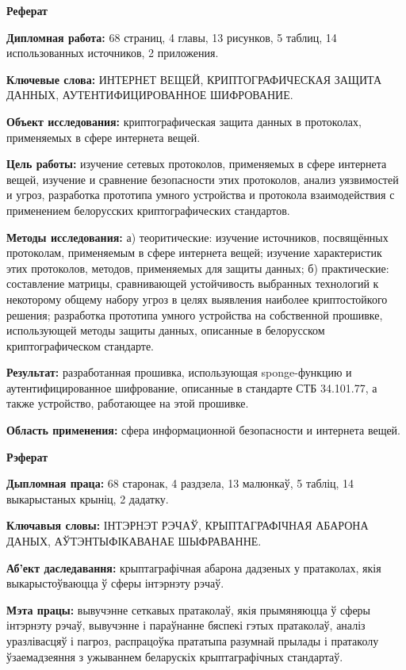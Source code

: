 \newpage
\begin{center}{\bf \Large Реферат}\end{center}
  
\textbf{Дипломная работа:} 68 страниц, 4 главы, 13 рисунков, 5 таблиц, 14 использованных источников,
2 приложения.

\textbf{Ключевые слова:} ИНТЕРНЕТ ВЕЩЕЙ, КРИПТОГРАФИЧЕСКАЯ ЗАЩИТА ДАННЫХ, 
АУТЕНТИФИЦИРОВАННОЕ ШИФРОВАНИЕ.

\textbf{Объект исследования:} криптографическая защита данных в протоколах, применяемых в сфере 
интернета вещей.

\textbf{Цель работы:} изучение сетевых протоколов, применяемых в сфере интернета вещей, изучение
и сравнение безопасности этих протоколов, анализ уязвимостей и угроз, разработка прототипа умного
устройства и протокола взаимодействия с применением белорусских криптографических стандартов.

\textbf{Методы исследования:} а) теоритические: изучение источников, посвящённых протоколам,
применяемым в сфере интернета вещей; изучение характеристик этих протоколов, методов, применяемых
для защиты данных; б) практические: составление матрицы, сравнивающей устойчивость выбранных 
технологий к некоторому общему набору угроз в целях выявления наиболее криптостойкого решения;
разработка прототипа умного устройства на собственной прошивке, использующей методы защиты
данных, описанные в белорусском криптографическом стандарте.

\textbf{Результат:} разработанная прошивка, использующая sponge-функцию и аутентифицированное
шифрование, описанные в стандарте СТБ 34.101.77, а также устройство, работающее на этой прошивке.

\textbf{Область применения:} сфера информационной безопасности и интернета вещей.



\newpage
\begin{center}{\bf \Large Рэферат}\end{center}

\textbf{Дыпломная праца:} 68 старонак, 4 раздзела, 13 малюнкаў, 5 табліц, 14 выкарыстаных крыніц,
2 дадатку.

\textbf{Ключавыя словы:} ІНТЭРНЭТ РЭЧАЎ, КРЫПТАГРАФІЧНАЯ АБАРОНА ДАНЫХ, АЎТЭНТЫФІКАВАНАЕ 
ШЫФРАВАННЕ.

\textbf{Аб'ект даследавання:} крыптаграфічная абарона дадзеных у пратаколах, якія выкарыстоўваюцца 
ў сферы інтэрнэту рэчаў.

\textbf{Мэта працы:} вывучэнне сеткавых пратаколаў, якія прымяняюцца ў сферы інтэрнэту рэчаў, вывучэнне 
і параўнанне бяспекі гэтых пратаколаў, аналіз уразлівасцяў і пагроз, распрацоўка прататыпа разумнай прылады 
і пратаколу ўзаемадзеяння з ужываннем беларускіх крыптаграфічных стандартаў.


